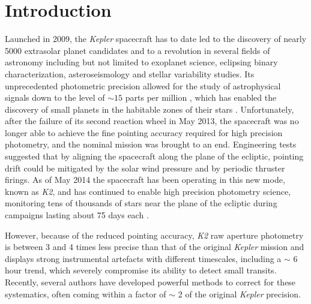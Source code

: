 \documentclass[]{emulateapj}
\begin{document}
\section{Introduction}
\label{sec:intro}
Launched in 2009, the \emph{Kepler} spacecraft has to date led to the discovery
of nearly 5000 extrasolar planet candidates
and to a revolution in several fields of astronomy including but not limited to
exoplanet science, eclipsing binary characterization, asteroseismology and stellar variability studies.
Its unprecedented photometric precision allowed for the study of astrophysical signals
down to the level of $\sim 15$ parts per million \citep{GIL11}, which has enabled the discovery
of small planets in the habitable zones of their stars \citep[e.g.,][]{BOR13,QUI14,TOR15}.
Unfortunately, after the failure of its second reaction wheel in May 2013, the spacecraft was
no longer able to achieve the fine pointing accuracy required for high precision photometry,
and the nominal mission was brought to an end. Engineering tests suggested that by aligning
the spacecraft along the plane of the ecliptic, pointing drift could be mitigated
by the solar wind pressure and by periodic thruster firings. As of May 2014 the spacecraft has been operating in
this new mode, known as \emph{K2}, and has continued to enable high precision photometry
science, monitoring tens of thousands of stars near the plane of the ecliptic during campaigns 
lasting about 75 days each \citep{HOW14}.

However, because of the reduced pointing accuracy, \emph{K2} raw aperture photometry is between 
3 and 4 times less precise than that of the original \emph{Kepler} mission and displays
strong instrumental artefacts with different timescales, including a $\sim$ 6 hour trend, which
severely compromise its ability to detect small transits. Recently, several authors
have developed powerful methods to correct for these systematics, often coming within
a factor of $\sim$ 2 of the original \emph{Kepler} precision.
\end{document}
